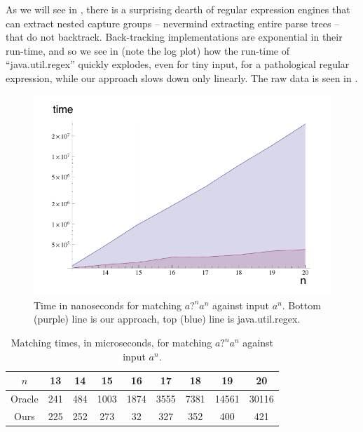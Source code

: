 \documentclass[english]{sigplanconf}
\theoremstyle{definition}
\begin{document}
As we will see in , there is a surprising dearth
of regular expression engines that can extract nested capture groups
-- nevermind extracting entire parse trees -- that do not backtrack.
Back-tracking implementations are exponential in their run-time,
and so we see in  (note the log plot) how the run-time
of ``java.util.regex'' quickly explodes, even for tiny input, for
a pathological regular expression, while our approach slows down
only linearly. The raw data is seen in .


\begin{figure}[h]
\includegraphics[width=\linewidth]{graphs/pathological-with-axes.pdf}
\caption{ Time in nanoseconds for matching $\textit{a?}^n\textit{a}^n$ against input $\textit{a}^n$. Bottom (purple) line is our approach, top (blue) line is java.util.regex.}
\end{figure}

\begin{table}
\begin{tabular}{ccccccccc|}
\hline 
$n$ & 13 & 14 & 15 & 16 & 17 & 18 & 19 & 20\tabularnewline
\hline 
\hline 
Oracle & 241 & 484 & 1003 & 1874 & 3555 & 7381 & 14561 & 30116\tabularnewline
\hline 
Ours & 225 & 252 & 273 & 32 & 327 & 352 & 400 & 421\tabularnewline
\hline 
\end{tabular}
\caption{Matching times, in microseconds, for matching $\textit{a?}^n\textit{a}^n$ against input $\textit{a}^n$.}
\end{table}
\end{document}

